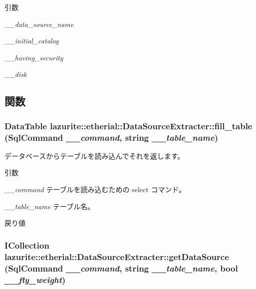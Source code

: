 \begin{DoxyParams}{引数}
\item[{\em \_\-\_\-data\_\-source\_\-name}]\item[{\em \_\-\_\-initial\_\-catalog}]\item[{\em \_\-\_\-having\_\-security}]\item[{\em \_\-\_\-disk}]\end{DoxyParams}


\subsection{関数}
\hypertarget{classlazurite_1_1etherial_1_1_data_source_extracter_a16e3cad62b7d0db5e84ad7656e025e2a}{
\subsubsection[{fill\_\-table}]{\setlength{\rightskip}{0pt plus 5cm}DataTable lazurite::etherial::DataSourceExtracter::fill\_\-table (SqlCommand {\em \_\-\_\-command}, \/  string {\em \_\-\_\-table\_\-name})}}
\label{classlazurite_1_1etherial_1_1_data_source_extracter_a16e3cad62b7d0db5e84ad7656e025e2a}


データベースからテーブルを読み込んでそれを返します。 
\begin{DoxyParams}{引数}
\item[{\em \_\-\_\-command}]テーブルを読み込むための select コマンド。\item[{\em \_\-\_\-table\_\-name}]テーブル名。\end{DoxyParams}
\begin{DoxyReturn}{戻り値}

\end{DoxyReturn}
\hypertarget{classlazurite_1_1etherial_1_1_data_source_extracter_a002f4d5a5f088770590e9df76dc43b21}{
\subsubsection[{getDataSource}]{\setlength{\rightskip}{0pt plus 5cm}ICollection lazurite::etherial::DataSourceExtracter::getDataSource (SqlCommand {\em \_\-\_\-command}, \/  string {\em \_\-\_\-table\_\-name}, \/  bool {\em \_\-\_\-fly\_\-weight})}}
\label{classlazurite_1_1etherial_1_1_data_source_extracter_a002f4d5a5f088770590e9df76dc43b21}


